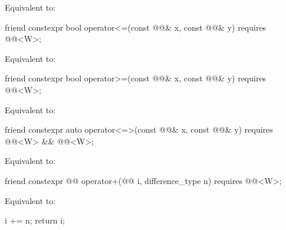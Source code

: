 \begin{itemdescr}
\pnum
\effects
Equivalent to: 
\end{itemdescr}

\begin{itemdecl}
friend constexpr bool operator<=(const @@& x, const @@& y)
  requires @@<W>;
\end{itemdecl}

\begin{itemdescr}
\pnum
\effects
Equivalent to: 
\end{itemdescr}

\begin{itemdecl}
friend constexpr bool operator>=(const @@& x, const @@& y)
  requires @@<W>;
\end{itemdecl}

\begin{itemdescr}
\pnum
\effects
Equivalent to: 
\end{itemdescr}

\begin{itemdecl}
friend constexpr auto operator<=>(const @@& x, const @@& y)
  requires @@<W> && @@<W>;
\end{itemdecl}

\begin{itemdescr}
\pnum
\effects
Equivalent to: 
\end{itemdescr}

\begin{itemdecl}
friend constexpr @@ operator+(@@ i, difference_type n)
  requires @@<W>;
\end{itemdecl}

\begin{itemdescr}
\pnum
\effects
Equivalent to:
\begin{codeblock}
i += n;
return i;
\end{codeblock}
\end{itemdescr}

